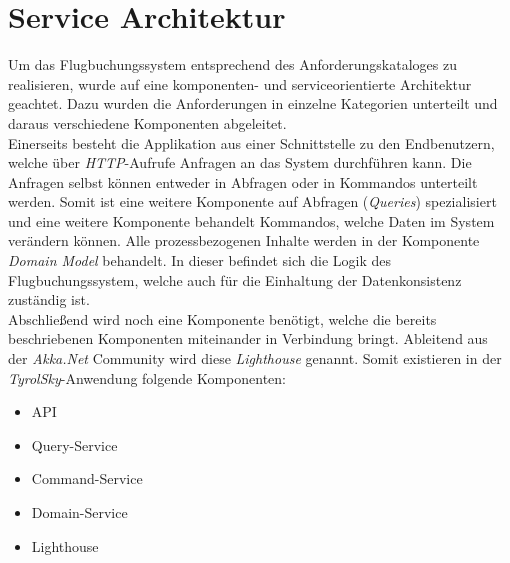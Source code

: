 \section{Service Architektur}
\label{sec:implementation:serviceAndComponentOrientation}
Um das Flugbuchungssystem entsprechend des Anforderungskataloges zu realisieren, wurde auf eine komponenten- und serviceorientierte Architektur geachtet. Dazu wurden die Anforderungen in einzelne Kategorien unterteilt und daraus verschiedene Komponenten abgeleitet. \\
Einerseits besteht die Applikation aus einer Schnittstelle zu den Endbenutzern, welche über \textit{HTTP}-Aufrufe Anfragen an das System durchführen kann. Die Anfragen selbst können entweder in Abfragen oder in Kommandos unterteilt werden. Somit ist eine weitere Komponente auf Abfragen (\textit{Queries}) spezialisiert und eine weitere Komponente behandelt Kommandos, welche Daten im System verändern können. Alle prozessbezogenen Inhalte werden in der Komponente \textit{Domain Model} behandelt. In dieser befindet sich die Logik des Flugbuchungssystem, welche auch für die Einhaltung der Datenkonsistenz zuständig ist. \\
% 
% 
Abschließend wird noch eine Komponente benötigt, welche die bereits beschriebenen Komponenten miteinander in Verbindung bringt. Ableitend aus der \textit{Akka.Net} Community wird diese \textit{Lighthouse} genannt. Somit existieren in der \textit{TyrolSky}-Anwendung folgende Komponenten:
% 
% 
\begin{itemize}
    \item API
    \item Query-Service
    \item Command-Service
    \item Domain-Service
    \item Lighthouse
\end{itemize}
